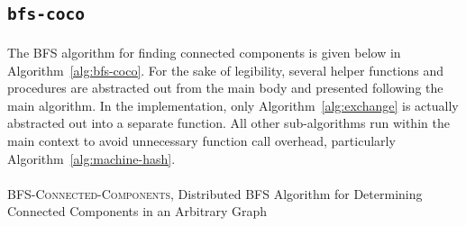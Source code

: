 \documentclass[11pt,epsf]{article}
\begin{document}
{  \subsection{\texttt{bfs-coco}}{
    \paragraph{}{
      The BFS algorithm for finding connected components is given below in Algorithm~\ref{alg:bfs-coco}.
      For the sake of legibility, several helper functions and procedures are abstracted out
      from the main body and presented following the main algorithm. In the implementation,
      only Algorithm~\ref{alg:exchange} is actually abstracted out into a separate function.
      All other sub-algorithms run within the main context to avoid unnecessary function call overhead,
      particularly Algorithm~\ref{alg:machine-hash}.
    }
    \paragraph{}{
      \begin{algorithm}
        \footnotesize
        \caption{\textsc{BFS-Connected-Components}, Distributed BFS Algorithm for Determining Connected Components in an Arbitrary Graph}
        \label{alg:bfs-coco}
        \begin{algorithmic}
          \ENDIF


\end{algorithmic}
\end{algorithm}}}}
\end{document}
